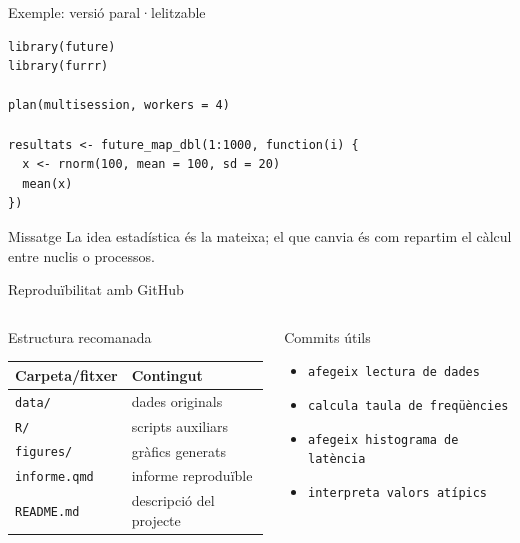 \documentclass[10pt,aspectratio=169]{beamer}
\begin{document}
\begin{frame}[fragile]{Exemple: versió paral·lelitzable}
\begin{lstlisting}
library(future)
library(furrr)

plan(multisession, workers = 4)

resultats <- future_map_dbl(1:1000, function(i) {
  x <- rnorm(100, mean = 100, sd = 20)
  mean(x)
})
\end{lstlisting}
\vspace{0.2cm}
\begin{block}{Missatge}
La idea estadística és la mateixa; el que canvia és com repartim el càlcul entre nuclis o processos.
\end{block}
\end{frame}

\begin{frame}{Reproduïbilitat amb GitHub}
\begin{columns}[T]
\begin{block}{Estructura recomanada}
\small
\begin{tabular}{ll}
\toprule
Carpeta/fitxer & Contingut \\
\midrule
\texttt{data/} & dades originals \\
\texttt{R/} & scripts auxiliars \\
\texttt{figures/} & gràfics generats \\
\texttt{informe.qmd} & informe reproduïble \\
\texttt{README.md} & descripció del projecte \\
\bottomrule
\end{tabular}
\end{block}
\begin{block}{Commits útils}
\begin{itemize}
  \item \texttt{afegeix lectura de dades}
  \item \texttt{calcula taula de freqüències}
  \item \texttt{afegeix histograma de latència}
  \item \texttt{interpreta valors atípics}
\end{itemize}
\end{block}
\end{columns}
\end{frame}
\end{document}
